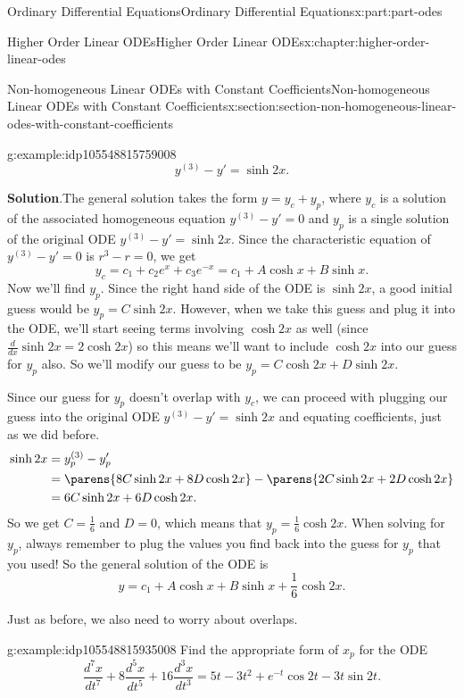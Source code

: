 \documentclass[twoside,10pt,]{book}
\newcommand{\blocktitlefont}{\relax}
\numberwithin{equation}{part}
\providecommand{\dv}[3][]{\dfrac{d^{#1} #2}{d #3^{#1}}}
\newcommand{\amp}{&}
\begin{document}
\begin{partptx}{Ordinary Differential Equations}{}{Ordinary Differential Equations}{}{}{x:part:part-odes}
\begin{chapterptx}{Higher Order Linear ODEs}{}{Higher Order Linear ODEs}{}{}{x:chapter:higher-order-linear-odes}
\begin{sectionptx}{Non-homogeneous Linear ODEs with Constant Coefficients}{}{Non-homogeneous Linear ODEs with Constant Coefficients}{}{}{x:section:section-non-homogeneous-linear-odes-with-constant-coefficients}
\begin{example}{}{g:example:idp105548815759008}
\begin{equation*}
y^{(3)}-y' = \sinh 2x.
\end{equation*}
%
\par\smallskip%
\noindent\textbf{\blocktitlefont Solution}.\hypertarget{g:solution:idp105548815759904}{}\quad{}The general solution takes the form \(y = y_{c}+y_{p}\), where \(y_{c}\) is a solution of the associated homogeneous equation \(y^{(3)}-y'=0\) and \(y_{p}\) is a single solution of the original ODE \(y^{(3)}-y'=\sinh 2x\). Since the characteristic equation of \(y^{(3)}-y'=0\) is \(r^{3}-r=0\), we get%
\begin{equation*}
y_{c} = c_{1}+c_{2}e^{x}+c_{3}e^{-x} = c_{1}+A\cosh x+B\sinh x.
\end{equation*}
Now we'll find \(y_{p}\). Since the right hand side of the ODE is \(\sinh 2x\), a good initial guess would be \(y_{p} = C\sinh 2x\). However, when we take this guess and plug it into the ODE, we'll start seeing terms involving \(\cosh 2x\) as well (since \(\frac{d}{dx}\sinh 2x = 2\cosh 2x\)) so this means we'll want to include \(\cosh 2x\) into our guess for \(y_{p}\) also. So we'll modify our guess to be \(y_{p} = C\cosh 2x+D\sinh 2x\).%
\par
Since our guess for \(y_{p}\) doesn't overlap with \(y_{c}\), we can proceed with plugging our guess into the original ODE \(y^{(3)}-y'=\sinh 2x\) and equating coefficients, just as we did before.%
\begin{align*}
\sinh 2x \amp= y^{(3)}_{p}-y'_{p}\\
\amp= \parens{8C\sinh2x+8D\cosh2x}-\parens{2C\sinh2x+2D\cosh2x}\\
\amp= 6C\sinh2x+6D\cosh2x.
\end{align*}
So we get \(C = \frac{1}{6}\) and \(D=0\), which means that \(y_{p} = \frac{1}{6}\cosh2x\). When solving for \(y_{p}\), always remember to plug the values you find back into the guess for \(y_{p}\) that you used! So the general solution of the ODE is%
\begin{equation*}
y = c_{1}+A\cosh x+B\sinh x+\frac{1}{6}\cosh2x.
\end{equation*}
%
\end{example}
Just as before, we also need to worry about overlaps.%
\begin{example}{}{g:example:idp105548815935008}%
Find the appropriate form of \(x_{p}\) for the ODE%
\begin{equation*}
\dv[7]{x}{t}+8\dv[5]{x}{t}+16\dv[3]{x}{t} = 5t-3t^{2}+e^{-t}\cos2t-3t\sin2t.
\end{equation*}
%
\par\smallskip%

\end{example}
\end{sectionptx}
\end{chapterptx}
\end{partptx}
\end{document}
